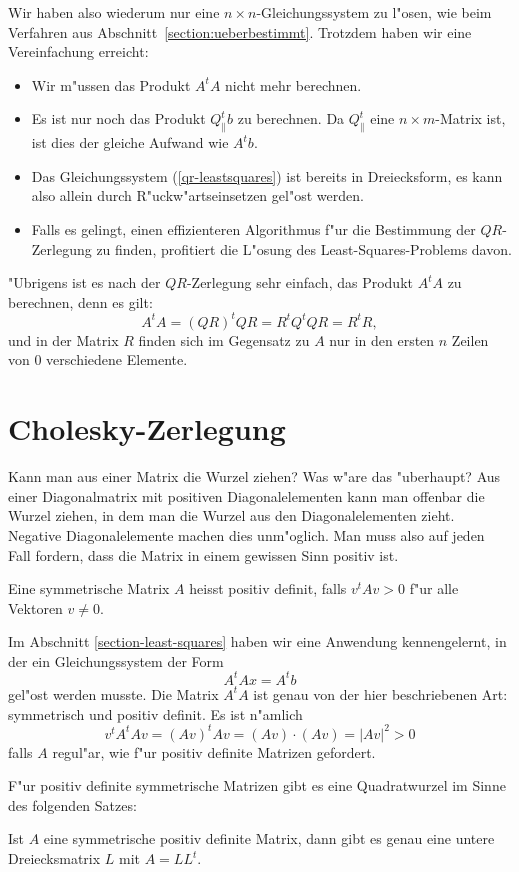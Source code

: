 Wir haben also wiederum nur eine $n\times n$-Gleichungssystem
zu l"osen, wie beim Verfahren aus Abschnitt~\ref{section:ueberbestimmt}.
Trotzdem haben wir eine Vereinfachung erreicht:
\begin{itemize}
\item Wir m"ussen das Produkt $A^tA$ nicht mehr berechnen.
\item Es ist nur noch das Produkt $Q_{\|}^tb$ zu berechnen.
Da $Q_{\|}^t$
eine $n\times m$-Matrix ist, ist dies der gleiche Aufwand wie $A^tb$.
\item Das Gleichungssystem (\ref{qr-leastsquares}) ist bereits in Dreiecksform,
es kann also allein durch R"uckw"artseinsetzen gel"ost werden.
\item Falls es gelingt, einen effizienteren Algorithmus f"ur die Bestimmung
der $QR$-Zerlegung zu finden, profitiert die L"osung des Least-Squares-Problems
davon.
\end{itemize}
"Ubrigens ist es nach der $QR$-Zerlegung sehr einfach, das Produkt $A^tA$
zu berechnen, denn es gilt:
\[
A^tA=(QR)^tQR=R^tQ^tQR=R^tR,
\]
und in der Matrix $R$ finden sich im Gegensatz zu $A$
nur in den ersten $n$ Zeilen von $0$ verschiedene Elemente.

\section{Cholesky-Zerlegung}
Kann man aus einer Matrix die Wurzel ziehen? Was w"are das "uberhaupt?
Aus einer Diagonalmatrix mit positiven Diagonalelementen kann man offenbar
die Wurzel ziehen, in dem man die Wurzel aus den Diagonalelementen zieht.
Negative Diagonalelemente machen dies unm"oglich.
Man muss also auf jeden
Fall fordern, dass die Matrix in einem gewissen Sinn positiv ist.

\begin{definition}
Eine symmetrische Matrix $A$ heisst positiv definit, falls $v^tAv>0$ f"ur
alle Vektoren $v\ne 0$.
\end{definition}

Im Abschnitt \ref{section-least-squares} haben wir eine Anwendung
kennengelernt, in der ein Gleichungssystem der Form
\[
A^tAx=A^t b
\]
gel"ost werden musste.
Die Matrix $A^tA$ ist genau von der hier
beschriebenen Art: symmetrisch und positiv definit.
Es ist n"amlich
\[
v^tA^tAv=(Av)^tAv=(Av)\cdot (Av)=|Av|^2> 0
\]
falls $A$ regul"ar, wie f"ur positiv definite Matrizen gefordert.

F"ur positiv definite symmetrische Matrizen gibt es eine Quadratwurzel
im Sinne des folgenden Satzes:
\begin{satz}
Ist $A$ eine symmetrische positiv definite Matrix, dann gibt es genau eine
untere Dreiecksmatrix $L$ mit $A=LL^t$.
\end{satz}

